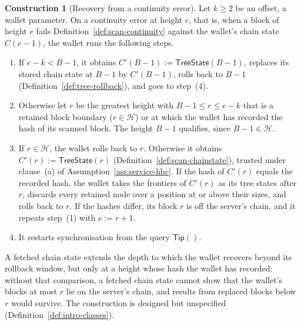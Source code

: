 \documentclass[11pt,a4paper]{article}
\theoremstyle{definition}
\newtheorem{construction}[theorem]{Construction}
\begin{document}
\begin{construction}[Recovery from a continuity error]\label{def:tree-recover}
Let $k \ge 2$ be an offset, a wallet parameter. On a continuity error at
height $e$, that is, when a block of height $e$ fails
Definition~\ref{def:scan-continuity} against the wallet's chain state
$C(e - 1)$, the wallet runs the following steps.
\begin{enumerate}[label=(\arabic*)]
\item If $e - k < B - 1$, it obtains $C'(B - 1) := \mathsf{TreeState}(B -
  1)$, replaces its stored chain state at $B - 1$ by $C'(B - 1)$, rolls back
  to $B - 1$ (Definition~\ref{def:tree-rollback}), and goes to step~(4).
\item Otherwise let $r$ be the greatest height with $B - 1 \le r \le e - k$
  that is a retained block boundary ($r \in \mathcal{H}$) or at which the
  wallet has recorded the hash of its scanned block. The height $B - 1$
  qualifies, since $B - 1 \in \mathcal{H}$.
\item If $r \in \mathcal{H}$, the wallet rolls back to $r$. Otherwise it
  obtains $C'(r) := \mathsf{TreeState}(r)$
  (Definition~\ref{def:scan-chainstate}), trusted under clause~(a) of
  Assumption~\ref{ass:service-hbc}. If the hash of $C'(r)$ equals the
  recorded hash, the wallet takes the frontiers of $C'(r)$ as its tree
  states after $r$, discards every retained node over a
  position at or above their sizes, and rolls back to $r$. If the hashes
  differ, its block $r$ is off the server's chain, and it repeats step~(1)
  with $e := r + 1$.
\item It restarts synchronisation from the query $\mathsf{Tip}()$.
\end{enumerate}
A fetched chain state extends the depth to which the wallet recovers beyond
its rollback window, but only at a height whose hash the wallet has
recorded: without that comparison, a fetched chain state cannot show that
the wallet's blocks at most $r$ lie on the server's chain, and results from
replaced blocks below $r$ would survive. The construction is designed but
unspecified (Definition~\ref{def:intro-classes}).
\end{construction}
\end{document}
